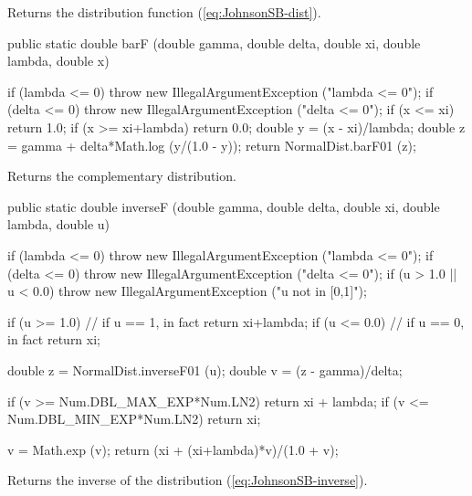  \begin{tabb}
  Returns the distribution function (\ref{eq:JohnsonSB-dist}).
 \end{tabb}
\begin{code}

   public static double barF (double gamma, double delta,
                              double xi, double lambda, double x)\begin{hide} {
      if (lambda <= 0)
         throw new IllegalArgumentException ("lambda <= 0");
      if (delta <= 0)
         throw new IllegalArgumentException ("delta <= 0");
      if (x <= xi)
         return 1.0;
      if (x >= xi+lambda)
         return 0.0;
      double y = (x - xi)/lambda;
      double z = gamma + delta*Math.log (y/(1.0 - y));
      return NormalDist.barF01 (z);
   }\end{hide}
\end{code}
  \begin{tabb}
  Returns the complementary distribution.
 \end{tabb}
\begin{code}

   public static double inverseF (double gamma, double delta,
                                  double xi, double lambda, double u)\begin{hide} {
      if (lambda <= 0)
         throw new IllegalArgumentException ("lambda <= 0");
      if (delta <= 0)
         throw new IllegalArgumentException ("delta <= 0");
      if (u > 1.0 || u < 0.0)
          throw new IllegalArgumentException ("u not in [0,1]");

      if (u >= 1.0)    // if u == 1, in fact
          return xi+lambda;
      if (u <= 0.0)    // if u == 0, in fact
          return xi;

      double z = NormalDist.inverseF01 (u);
      double v = (z - gamma)/delta;

      if (v >= Num.DBL_MAX_EXP*Num.LN2)
            return xi + lambda;
      if (v <= Num.DBL_MIN_EXP*Num.LN2)
            return xi;

      v = Math.exp (v);
      return (xi + (xi+lambda)*v)/(1.0 + v);
   }\end{hide}
\end{code}
  \begin{tabb}
  Returns the inverse of the distribution (\ref{eq:JohnsonSB-inverse}).
 \end{tabb}

